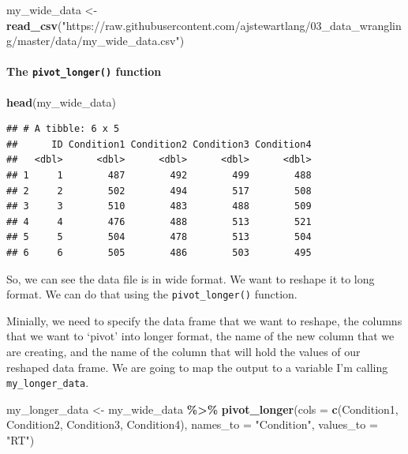 \documentclass[
]{book}
\newenvironment{Shaded}{\begin{snugshade}}{\end{snugshade}}
\newcommand{\AttributeTok}[1]{\textcolor[rgb]{0.13,0.29,0.53}{#1}}
\newcommand{\FunctionTok}[1]{\textcolor[rgb]{0.13,0.29,0.53}{\textbf{#1}}}
\newcommand{\NormalTok}[1]{#1}
\newcommand{\OtherTok}[1]{\textcolor[rgb]{0.56,0.35,0.01}{#1}}
\newcommand{\SpecialCharTok}[1]{\textcolor[rgb]{0.81,0.36,0.00}{\textbf{#1}}}
\newcommand{\StringTok}[1]{\textcolor[rgb]{0.31,0.60,0.02}{#1}}
\begin{document}
\begin{Shaded}
\begin{Highlighting}[]
\NormalTok{my\_wide\_data }\OtherTok{\textless{}{-}} \FunctionTok{read\_csv}\NormalTok{(}\StringTok{"https://raw.githubusercontent.com/ajstewartlang/03\_data\_wrangling/master/data/my\_wide\_data.csv"}\NormalTok{)}
\end{Highlighting}
\end{Shaded}

\hypertarget{the-pivot_longer-function}{%
\paragraph*{\texorpdfstring{The \texttt{pivot\_longer()} function}{The pivot\_longer() function}}\label{the-pivot_longer-function}}

\begin{Shaded}
\begin{Highlighting}[]
\FunctionTok{head}\NormalTok{(my\_wide\_data)}
\end{Highlighting}
\end{Shaded}

\begin{verbatim}
## # A tibble: 6 x 5
##      ID Condition1 Condition2 Condition3 Condition4
##   <dbl>      <dbl>      <dbl>      <dbl>      <dbl>
## 1     1        487        492        499        488
## 2     2        502        494        517        508
## 3     3        510        483        488        509
## 4     4        476        488        513        521
## 5     5        504        478        513        504
## 6     6        505        486        503        495
\end{verbatim}

So, we can see the data file is in wide format. We want to reshape it to long format. We can do that using the \texttt{pivot\_longer()} function.

Minially, we need to specify the data frame that we want to reshape, the columns that we want to `pivot' into longer format, the name of the new column that we are creating, and the name of the column that will hold the values of our reshaped data frame. We are going to map the output to a variable I'm calling \texttt{my\_longer\_data}.

\begin{Shaded}
\begin{Highlighting}[]
\NormalTok{my\_longer\_data }\OtherTok{\textless{}{-}}\NormalTok{ my\_wide\_data }\SpecialCharTok{\%\textgreater{}\%}
  \FunctionTok{pivot\_longer}\NormalTok{(}\AttributeTok{cols =} \FunctionTok{c}\NormalTok{(Condition1, Condition2, Condition3, Condition4), }
               \AttributeTok{names\_to =} \StringTok{"Condition"}\NormalTok{, }
               \AttributeTok{values\_to =} \StringTok{"RT"}\NormalTok{)}
\end{Highlighting}
\end{Shaded}
\end{document}
